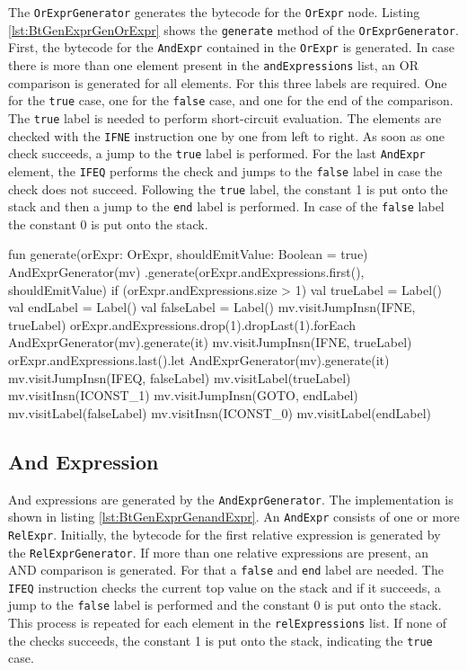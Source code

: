 The \verb|OrExprGenerator| generates the bytecode for the \verb|OrExpr| node. Listing \ref{lst:BtGenExprGenOrExpr} shows the \verb|generate| method of the \verb|OrExprGenerator|. First, the bytecode for the \verb|AndExpr| contained in the \verb|OrExpr| is generated. In case there is more than one element present in the \verb|andExpressions| list, an OR comparison is generated for all elements. For this three labels are required. One for the \verb|true| case, one for the \verb|false| case, and one for the end of the comparison. The \verb|true| label is needed to perform short-circuit evaluation. The elements are checked with the \verb|IFNE| instruction one by one from left to right. As soon as one check succeeds, a jump to the \verb|true| label is performed. For the last \verb|AndExpr| element, the \verb|IFEQ| performs the check and jumps to the \verb|false| label in case the check does not succeed. Following the \verb|true| label, the constant 1 is put onto the stack and then a jump to the \verb|end| label is performed. In case of the \verb|false| label the constant 0 is put onto the stack. 


\begin{KotlinCode}[float,numbers=none,caption=Implementation of the \texttt{generate} method of the \texttt{OrExprGenerator}., label=lst:BtGenExprGenOrExpr]
fun generate(orExpr: OrExpr, shouldEmitValue: Boolean = true) {
    AndExprGenerator(mv)
        .generate(orExpr.andExpressions.first(), shouldEmitValue)
    if (orExpr.andExpressions.size > 1) {
        val trueLabel = Label()
        val endLabel = Label()
        val falseLabel = Label()
        mv.visitJumpInsn(IFNE, trueLabel)
        orExpr.andExpressions.drop(1).dropLast(1).forEach {
            AndExprGenerator(mv).generate(it)
            mv.visitJumpInsn(IFNE, trueLabel)
        }
        orExpr.andExpressions.last().let {
            AndExprGenerator(mv).generate(it)
            mv.visitJumpInsn(IFEQ, falseLabel)
        }
        mv.visitLabel(trueLabel)
        mv.visitInsn(ICONST_1)
        mv.visitJumpInsn(GOTO, endLabel)
        mv.visitLabel(falseLabel)
        mv.visitInsn(ICONST_0)
        mv.visitLabel(endLabel)
    }
}
\end{KotlinCode}


\subsection{And Expression}

And expressions are generated by the \verb|AndExprGenerator|. The implementation is shown in listing \ref{lst:BtGenExprGenandExpr}. An \verb|AndExpr| consists of one or more \verb|RelExpr|. Initially, the bytecode for the first relative expression is generated by the \verb|RelExprGenerator|. If more than one relative expressions are present, an AND comparison is generated. For that a \verb|false| and \verb|end| label are needed. The \verb|IFEQ| instruction checks the current top value on the stack and if it succeeds, a jump to the \verb|false| label is performed and the constant 0 is put onto the stack. This process is repeated for each element in the \verb|relExpressions| list. If none of the checks succeeds, the constant 1 is put onto the stack, indicating the \verb|true| case. 

